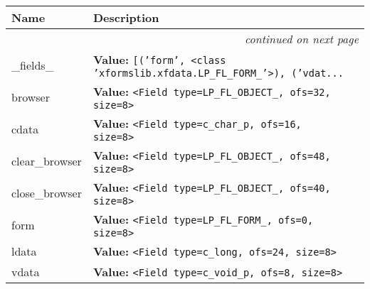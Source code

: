     \vspace{-1cm}
\hspace{\varindent}\begin{longtable}{|p{\varnamewidth}|p{\vardescrwidth}|l}
\cline{1-2}
\cline{1-2} \centering \textbf{Name} & \centering \textbf{Description}& \\
\cline{1-2}
\endhead\cline{1-2}\multicolumn{3}{r}{\small\textit{continued on next page}}\\\endfoot\cline{1-2}
\endlastfoot\raggedright \_\-f\-i\-e\-l\-d\-s\-\_\- & \raggedright \textbf{Value:} 
{\tt \texttt{[}\texttt{(}\texttt{'}\texttt{form}\texttt{'}\texttt{, }{\textless}class 'xformslib.xfdata.LP\_FL\_FORM\_'{\textgreater}\texttt{)}\texttt{, }\texttt{(}\texttt{'}\texttt{vdat}\texttt{...}}&\\
\cline{1-2}
\raggedright b\-r\-o\-w\-s\-e\-r\- & \raggedright \textbf{Value:} 
{\tt {\textless}Field type=LP\_FL\_OBJECT\_, ofs=32, size=8{\textgreater}}&\\
\cline{1-2}
\raggedright c\-d\-a\-t\-a\- & \raggedright \textbf{Value:} 
{\tt {\textless}Field type=c\_char\_p, ofs=16, size=8{\textgreater}}&\\
\cline{1-2}
\raggedright c\-l\-e\-a\-r\-\_\-b\-r\-o\-w\-s\-e\-r\- & \raggedright \textbf{Value:} 
{\tt {\textless}Field type=LP\_FL\_OBJECT\_, ofs=48, size=8{\textgreater}}&\\
\cline{1-2}
\raggedright c\-l\-o\-s\-e\-\_\-b\-r\-o\-w\-s\-e\-r\- & \raggedright \textbf{Value:} 
{\tt {\textless}Field type=LP\_FL\_OBJECT\_, ofs=40, size=8{\textgreater}}&\\
\cline{1-2}
\raggedright f\-o\-r\-m\- & \raggedright \textbf{Value:} 
{\tt {\textless}Field type=LP\_FL\_FORM\_, ofs=0, size=8{\textgreater}}&\\
\cline{1-2}
\raggedright l\-d\-a\-t\-a\- & \raggedright \textbf{Value:} 
{\tt {\textless}Field type=c\_long, ofs=24, size=8{\textgreater}}&\\
\cline{1-2}
\raggedright v\-d\-a\-t\-a\- & \raggedright \textbf{Value:} 
{\tt {\textless}Field type=c\_void\_p, ofs=8, size=8{\textgreater}}&\\
\cline{1-2}
\end{longtable}



